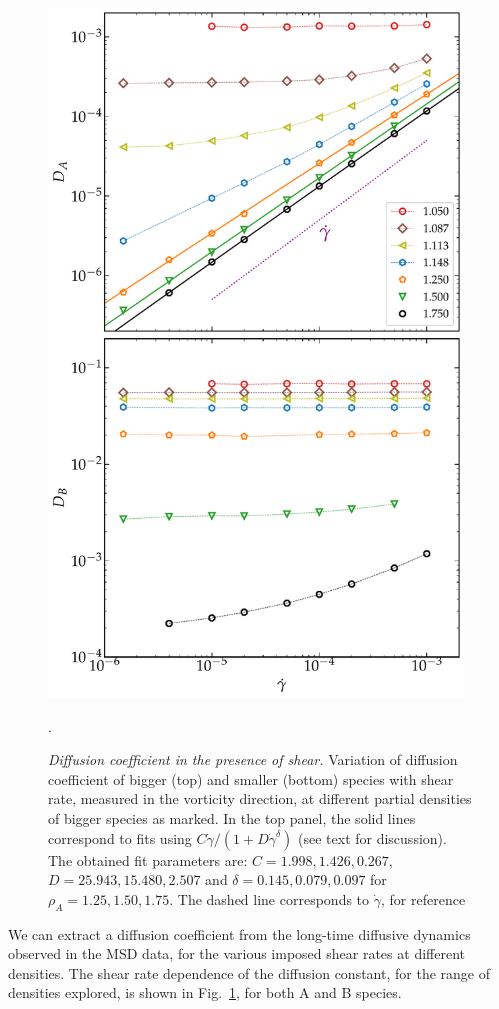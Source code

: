 %
\begin{figure}[htb!]
\includegraphics[width=11cm]{figs/fig7p7.pdf}
\centering
\caption[{\em Diffusion coefficient in the presence of shear}]{{\em Diffusion coefficient in the presence of shear.} Variation of diffusion coefficient of bigger (top) and smaller (bottom) species with shear rate, measured in the vorticity direction, at different partial densities of bigger species as marked. In the top panel, the solid lines correspond to fits using $C\dot{\gamma}/(1+D\dot{\gamma}^{\delta})$ (see text for discussion). The obtained fit parameters are: $C = 1.998, 1.426, 0.267$, $D = 25.943, 15.480, 2.507$ and $\delta = 0.145, 0.079, 0.097$ for $\rho_A = 1.25, 1.50, 1.75$. The dashed line corresponds to $\dot{\gamma}$, for reference}.
\label{fig7}
\end{figure}
%

We can extract a diffusion coefficient from the long-time diffusive dynamics observed in the MSD data, for the various imposed shear rates at different densities. The shear rate dependence of the diffusion constant, for the range of densities explored, is shown in Fig.~\ref{fig7}, for both A and B species.


